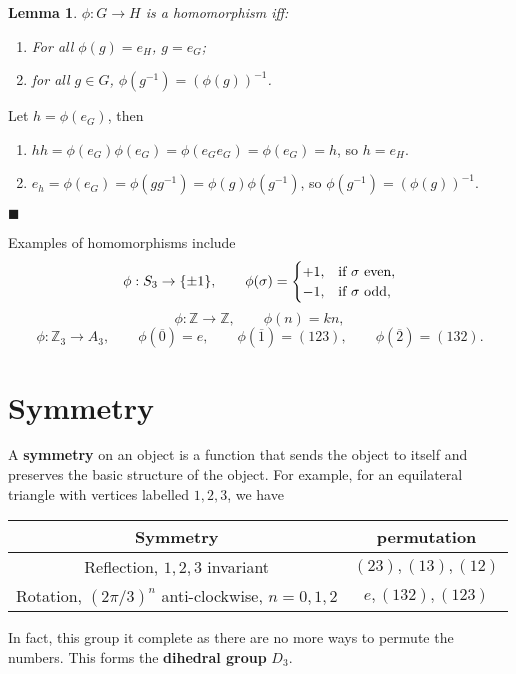 \documentclass[letter-paper]{tufte-book}
\newtheorem{lemma}[theorem]{\color{pastel-blue}Lemma}
\newenvironment{proof}[1][Proof]{\begin{trivlist}
\item[\hskip \labelsep {\bfseries #1}]}{\end{trivlist}}
\newenvironment{example}[1][Example]{\begin{trivlist}
\item[\hskip \labelsep {\bfseries #1}]}{\end{trivlist}}
\newcommand\Def[1]{\textbf{#1}}
\newcommand{\qed}{\hfill$\blacksquare$}
\begin{document}
\begin{lemma}
  $\phi:G\rightarrow H$ is a homomorphism iff:
  \begin{enumerate}
    \item For all $\phi(g)=e_H$, $g=e_G$;
    \item for all $g\in G$, $\phi(g^{-1})=(\phi(g))^{-1}$.
  \end{enumerate}
\end{lemma}
\begin{proof}
  Let $h=\phi(e_G)$, then
  \begin{enumerate}
    \item $hh=\phi(e_G)\phi(e_G)=\phi(e_G e_G)=\phi(e_G)=h$, so $h=e_H$.
    \item $e_h=\phi(e_G)=\phi(gg^{-1})=\phi(g)\phi(g^{-1})$, so $\phi(g^{-1})=
    (\phi(g))^{-1}$.
  \end{enumerate}
  \qed
\end{proof}

\begin{example}
  Examples of homomorphisms include
  \begin{equation*}
    \phi: S_3\rightarrow\{\pm1\},\qquad \phi(\sigma)=\begin{cases}
    +1, &\textnormal{if $\sigma$ even},\\
    -1, &\textnormal{if $\sigma$ odd},\end{cases}
  \end{equation*}
  \begin{equation*}
    \phi:\mathbb{Z}\rightarrow\mathbb{Z},\qquad \phi(n)=kn,
  \end{equation*}
  \begin{equation*}
    \phi:\mathbb{Z}_3\rightarrow A_3,\qquad \phi(\overline{0})=e,\qquad
    \phi(\overline{1})=(123),\qquad \phi(\overline{2})=(132).
  \end{equation*}
\end{example}

\section{Symmetry}

A \Def{symmetry} on an object is a function that sends the object to itself and
preserves the basic structure of the object. For example, for an equilateral
triangle with vertices labelled $1,2,3$, we have
\begin{table}[h]
  \begin{center}
  \begin{tabular}{c|c}
		Symmetry & permutation\\
		\hline
		Reflection, $1,2,3$ invariant & $(23),(13),(12)$\\
		Rotation, $(2\pi/3)^n$ anti-clockwise, $n=0,1,2$ & $e,(132),(123)$
	\end{tabular}\end{center}
\end{table}
In fact, this group it complete as there are no more ways to permute the 
numbers. This forms the \Def{dihedral group} $D_3$.
\end{document}
